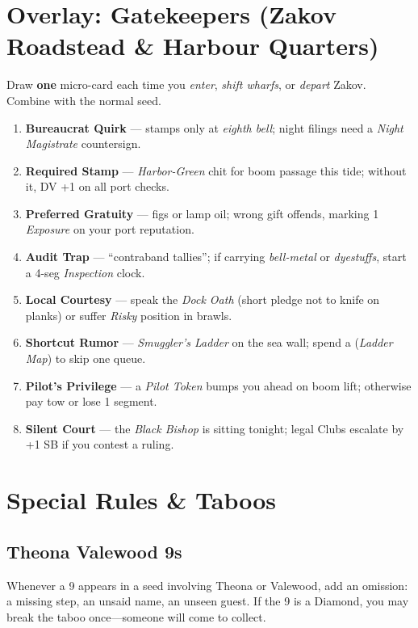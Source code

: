 \section{Overlay: Gatekeepers (Zakov Roadstead \& Harbour Quarters)}
Draw \textbf{one} micro-card each time you \emph{enter}, \emph{shift wharfs}, or \emph{depart} Zakov. Combine with the normal seed.

\begin{tcolorbox}[enhanced,breakable,sharp corners,boxrule=.6pt,title={Zakov Gatekeepers Micro-Cards (draw 1)}]
\begin{enumerate}[label=\arabic*.]
  \item \textbf{Bureaucrat Quirk} — stamps only at \emph{eighth bell}; night filings need a \emph{Night Magistrate} countersign.
  \item \textbf{Required Stamp} — \emph{Harbor-Green} chit for boom passage this tide; without it, DV +1 on all port checks.
  \item \textbf{Preferred Gratuity} — figs or lamp oil; wrong gift offends, marking 1 \emph{Exposure} on your port reputation.
  \item \textbf{Audit Trap} — ``contraband tallies''; if carrying \emph{bell-metal} or \emph{dyestuffs}, start a 4-seg \emph{Inspection} clock.
  \item \textbf{Local Courtesy} — speak the \emph{Dock Oath} (short pledge not to knife on planks) or suffer \emph{Risky} position in brawls.
  \item \textbf{Shortcut Rumor} — \emph{Smuggler's Ladder} on the sea wall; spend a \SuitDiamond{} (\emph{Ladder Map}) to skip one queue.
  \item \textbf{Pilot's Privilege} — a \emph{Pilot Token} bumps you ahead on boom lift; otherwise pay tow or lose 1 segment.
  \item \textbf{Silent Court} — the \emph{Black Bishop} is sitting tonight; legal Clubs escalate by +1 SB if you contest a ruling.
\end{enumerate}
\end{tcolorbox}

\section{Special Rules \& Taboos}

\subsection{Theona Valewood 9s}
Whenever a 9 appears in a seed involving Theona or Valewood, add an omission: a missing step, an unsaid name, an unseen guest. If the 9 is a Diamond, you may break the taboo once---someone will come to collect.

